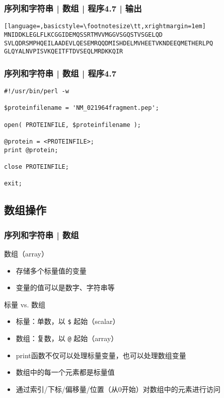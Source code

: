 \begin{frame}[fragile]
  \frametitle{序列和字符串 | 数组 | 程序4.7 | 输出}
\begin{lstlisting}[language=,basicstyle=\footnotesize\tt,xrightmargin=1em]
MNIDDKLEGLFLKCGGIDEMQSSRTMVVMGGVSGQSTVSGELQD
SVLQDRSMPHQEILAADEVLQESEMRQQDMISHDELMVHEETVKNDEEQMETHERLPQ
GLQYALNVPISVKQEITFTDVSEQLMRDKKQIR
\end{lstlisting}
\end{frame}

\begin{frame}[fragile]
  \frametitle{序列和字符串 | 数组 | \alert{程序4.7}}
\begin{lstlisting}
#!/usr/bin/perl -w

$proteinfilename = 'NM_021964fragment.pep';

open( PROTEINFILE, $proteinfilename );

@protein = <PROTEINFILE>;
print @protein;

close PROTEINFILE;

exit;
\end{lstlisting}
\end{frame}

\subsection{数组操作}
\begin{frame}[fragile]
  \frametitle{序列和字符串 | \alert{数组}}
  \begin{block}{数组（array）}
    \begin{itemize}
      \item 存储多个标量值的变量
      \item 变量的值可以是数字、字符串等
    \end{itemize}
  \end{block}
  \pause
  \begin{block}{标量 vs. 数组}
    \begin{itemize}
      \item 标量：单数，以 \verb|$| 起始（scalar）
      \item 数组：复数，以 \verb|@| 起始（array）
      \item print函数不仅可以处理标量变量，也可以处理数组变量
      \item 数组中的每一个元素都是标量值
      \item 通过索引/下标/偏移量/位置（从0开始）对数组中的元素进行访问
    \end{itemize}
  \end{block}
\end{frame}

